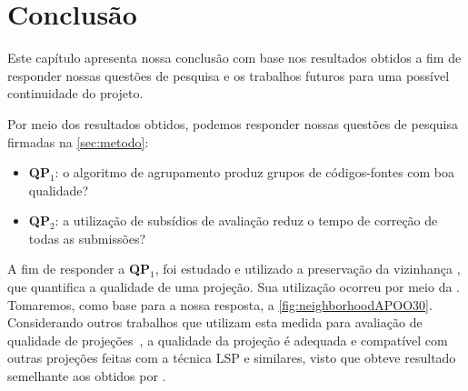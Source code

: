 \chapter{Conclusão}
\label{chap:Conclusao}

	Este capítulo apresenta nossa conclusão com base nos resultados obtidos a fim de
	responder nossas questões de pesquisa e os trabalhos futuros para uma possível
	continuidade do projeto.
	
	Por meio dos resultados obtidos, podemos responder nossas questões de pesquisa
	firmadas na \cref{sec:metodo}:
	
	\begin{itemize}
		\item \textbf{QP$_1$}: o algoritmo de agrupamento produz grupos de códigos-fontes
		com boa qualidade?
		\item \textbf{QP$_2$}: a utilização de subsídios de avaliação reduz o tempo
		de correção de todas as submissões?
	\end{itemize}
	
	A fim de responder a \textbf{QP$_1$}, foi estudado e utilizado a preservação
	da vizinhança \cite{paulovich2008hipp}, que quantifica a qualidade de uma projeção.
	Sua utilização ocorreu por meio da . Tomaremos, como base
	para a nossa resposta, a \cref{fig:neighborhoodAPOO30}. Considerando outros trabalhos
	que utilizam esta medida para avaliação de qualidade de projeções~\cite{phd:paulovich},
	a qualidade da projeção é adequada e compatível com outras projeções feitas com
	a técnica LSP e similares, visto que obteve resultado semelhante aos obtidos por
	.
	
